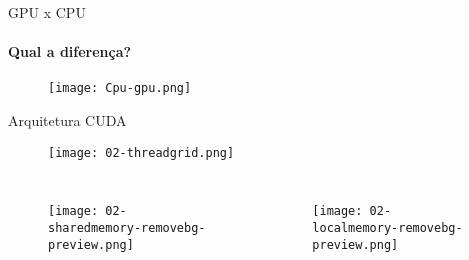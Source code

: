 \begin{frame}[t]{GPU x CPU}
    \framesubtitle{Qual a diferença?}
    \begin{figure}
        \texttt{[image: Cpu-gpu.png]}
    \end{figure}

\end{frame}
\begin{frame}[t]{Arquitetura CUDA}
    \begin{figure}
        \texttt{[image: 02-threadgrid.png]}
    \end{figure}
    \begin{columns}
            \begin{figure}
               \texttt{[image: 02-sharedmemory-removebg-preview.png]}
            \end{figure}
        
            \begin{figure}
               \texttt{[image: 02-localmemory-removebg-preview.png]}
            \end{figure}
    \end{columns}
\end{frame}
